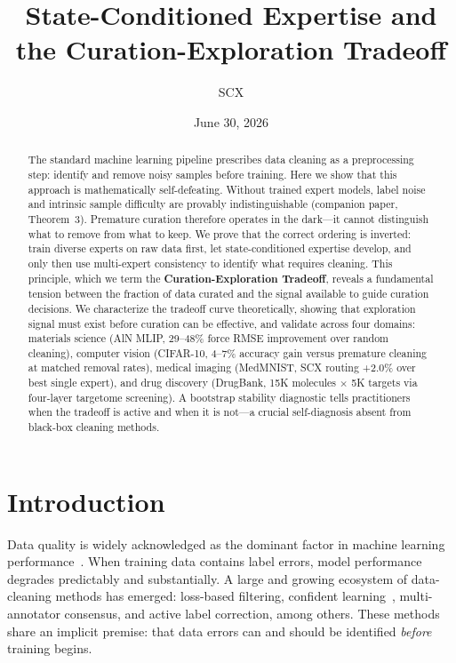 \documentclass[12pt,a4paper]{article}
\title{State-Conditioned Expertise and the Curation-Exploration Tradeoff}
\author{SCX}
\date{June 30, 2026}
\begin{document}
\maketitle

\begin{abstract}
The standard machine learning pipeline prescribes data cleaning as a preprocessing step: identify and remove noisy samples before training. Here we show that this approach is mathematically self-defeating. Without trained expert models, label noise and intrinsic sample difficulty are provably indistinguishable (companion paper, Theorem~3). Premature curation therefore operates in the dark---it cannot distinguish what to remove from what to keep. We prove that the correct ordering is inverted: train diverse experts on raw data first, let state-conditioned expertise develop, and only then use multi-expert consistency to identify what requires cleaning. This principle, which we term the \textbf{Curation-Exploration Tradeoff}, reveals a fundamental tension between the fraction of data curated and the signal available to guide curation decisions. We characterize the tradeoff curve theoretically, showing that exploration signal must exist before curation can be effective, and validate across four domains: materials science (AlN MLIP, 29--48\% force RMSE improvement over random cleaning), computer vision (CIFAR-10, 4--7\% accuracy gain versus premature cleaning at matched removal rates), medical imaging (MedMNIST, SCX routing +2.0\% over best single expert), and drug discovery (DrugBank, 15K molecules $\times$ 5K targets via four-layer targetome screening). A bootstrap stability diagnostic tells practitioners when the tradeoff is active and when it is not---a crucial self-diagnosis absent from black-box cleaning methods.
\end{abstract}

\section{Introduction}

Data quality is widely acknowledged as the dominant factor in machine learning performance~\cite{sambasivan2021}. When training data contains label errors, model performance degrades predictably and substantially. A large and growing ecosystem of data-cleaning methods has emerged: loss-based filtering, confident learning~\cite{northcutt2021}, multi-annotator consensus, and active label correction, among others. These methods share an implicit premise: that data errors can and should be identified \emph{before} training begins.
\end{document}
